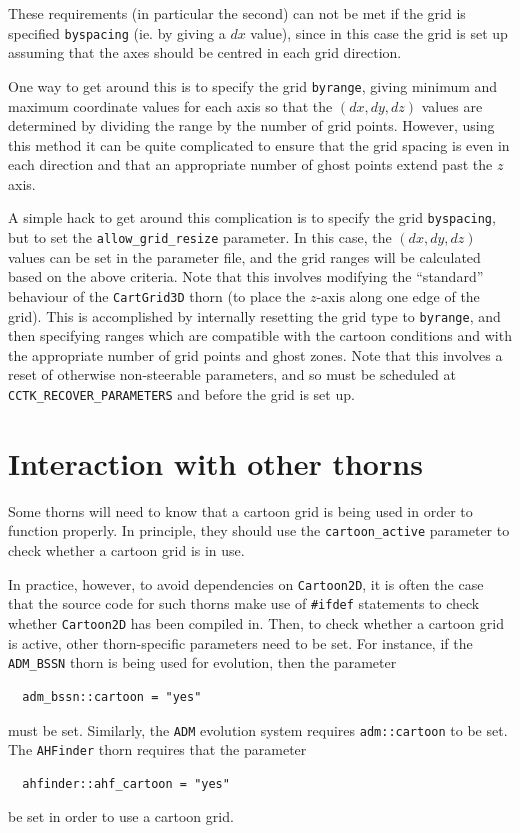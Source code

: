 \documentclass{article}
\begin{document}
These requirements (in particular the second) can not be met if the
grid is specified \texttt{byspacing} (ie. by giving a $dx$ value),
since in this case the grid is set up assuming that the axes should be
centred in each grid direction.

One way to get around this is to specify the grid \texttt{byrange},
giving minimum and maximum coordinate values for each axis so that the
$(dx,dy,dz)$ values are determined by dividing the range by the number
of grid points. However, using this method it can be quite complicated
to ensure that the grid spacing is even in each direction and that an
appropriate number of ghost points extend past the $z$ axis.

A simple hack to get around this complication is to specify the grid
\texttt{byspacing}, but to set the \texttt{allow\_grid\_resize}
parameter. In this case, the $(dx,dy,dz)$ values can be set in the
parameter file, and the grid ranges will be calculated based on the
above criteria. Note that this involves modifying the ``standard''
behaviour of the \texttt{CartGrid3D} thorn (to place the $z$-axis
along one edge of the grid). This is accomplished by internally
resetting the grid type to \texttt{byrange}, and then specifying
ranges which are compatible with the cartoon conditions and with the
appropriate number of grid points and ghost zones. Note that this
involves a reset of otherwise non-steerable parameters, and so must be
scheduled at \texttt{CCTK\_RECOVER\_PARAMETERS} and before the grid is
set up.

\section{Interaction with other thorns}
\label{sec:interaction}

Some thorns will need to know that a cartoon grid is being used in
order to function properly. In principle, they should use the
\texttt{cartoon\_active} parameter to check whether a cartoon grid is
in use.

In practice, however, to avoid dependencies on \texttt{Cartoon2D}, it
is often the case that the source code for such thorns make use of
\texttt{\#ifdef} statements to check whether \texttt{Cartoon2D} has
been compiled in. Then, to check whether a cartoon grid is active,
other thorn-specific parameters need to be set. For instance, if the
\texttt{ADM\_BSSN} thorn is being used for evolution, then the
parameter
\begin{verbatim}
  adm_bssn::cartoon = "yes"
\end{verbatim}
must be set. Similarly, the \texttt{ADM} evolution system requires
\texttt{adm::cartoon} to be set. The \texttt{AHFinder} thorn requires
that the parameter
\begin{verbatim}
  ahfinder::ahf_cartoon = "yes"
\end{verbatim}
be set in order to use a cartoon grid.
\end{document}
